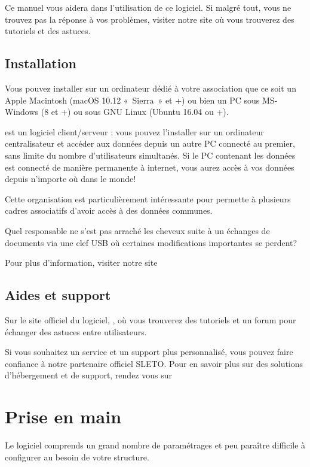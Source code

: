 \documentclass[a4paper,10pt,oneside,french]{sphinxmanual}
\begin{document}
Ce manuel vous aidera dans l’utilisation de ce logiciel.
Si malgré tout, vous ne trouvez pas la réponse à vos problèmes, visiter notre site  où vous trouverez des tutoriels et des astuces.


\subsection{Installation}
\label{\detokenize{syndic/presentation:installation}}
Vous pouvez installer  sur un ordinateur dédié à votre association que ce soit un Apple Macintosh (macOS 10.12 « Sierra » et +) ou bien un PC sous MS-Windows (8 et +) ou sous GNU Linux (Ubuntu 16.04 ou +).

 est un logiciel client/serveur : vous pouvez l’installer sur un ordinateur centralisateur et accéder aux données depuis un autre PC connecté au premier, sans limite du nombre d’utilisateurs simultanés.
Si le PC contenant les données est connecté de manière permanente à internet, vous aurez accès à vos données depuis n’importe où dans le monde!

Cette organisation est particulièrement intéressante pour permette à plusieurs cadres associatifs d’avoir accès à des données communes.

Quel responsable ne s’est pas arraché les cheveux suite à un échanges de documents via une clef USB où certaines modifications importantes se perdent?

Pour plus d’information, visiter notre site 


\subsection{Aides et support}
\label{\detokenize{syndic/presentation:aides-et-support}}
Sur le site officiel du logiciel, , où vous trouverez des tutoriels et un forum pour échanger des astuces entre utilisateurs.

Si vous souhaitez un service et un support plus personnalisé, vous pouvez faire confiance à notre partenaire officiel SLETO.
Pour en savoir plus sur des solutions d’hébergement et de support, rendez vous sur 


\section{Prise en main}
\label{\detokenize{syndic/first_step:prise-en-main}}\label{\detokenize{syndic/first_step::doc}}
Le logiciel  comprends un grand nombre de paramétrages et peu paraître difficile à configurer au besoin de votre structure.
\end{document}
